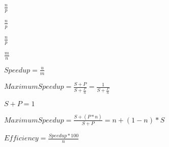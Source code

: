 \documentclass[10pt]{book}
\begin{document}
\begin{mdSnippets}
\begin{mdInlineSnippet}[968be6b12d27790352ef2e42488bd0d9]%
$\frac{n}{p}$\end{mdInlineSnippet}%
\begin{mdInlineSnippet}[968be6b12d27790352ef2e42488bd0d9]%
$\frac{n}{p}$\end{mdInlineSnippet}%
\begin{mdInlineSnippet}[968be6b12d27790352ef2e42488bd0d9]%
$\frac{n}{p}$\end{mdInlineSnippet}%
\begin{mdInlineSnippet}%
$\frac{m}{n}$\end{mdInlineSnippet}%
\begin{mdInlineSnippet}[54d27233387cec200d7a0a80f6f296c5]%
$Speedup = \frac{u}{m}$\end{mdInlineSnippet}%
\begin{mdInlineSnippet}[299e38c7bb4e8309cee5af20f5493a33]%
$Maximum Speedup = \frac{S + P}{S + \frac{P}{n}} = \frac{1}{S + \frac{P}{n}}$\end{mdInlineSnippet}%
\begin{mdInlineSnippet}[44c5dd7ed33800d693c232c130ead225]%
$S + P = 1$\end{mdInlineSnippet}%
\begin{mdInlineSnippet}%
$Maximum Speedup = \frac{S + (P * n)}{S + P} = n + (1 - n) *S$\end{mdInlineSnippet}%
\begin{mdInlineSnippet}%
$Efficiency = \frac{Speedup * 100}{n}$\end{mdInlineSnippet}%

\end{mdSnippets}
\end{document}
